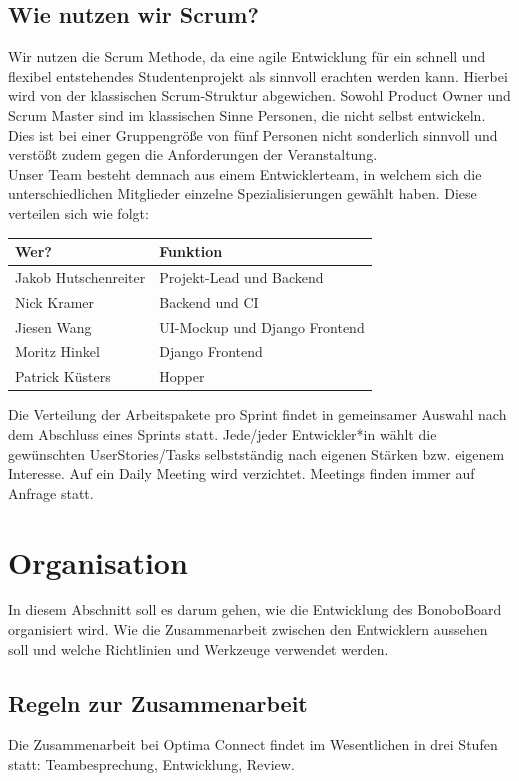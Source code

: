 \documentclass[a4paper,11pt]{scrartcl}
\begin{document}
\subsection{Wie nutzen wir Scrum?}
Wir nutzen die Scrum Methode, da eine agile Entwicklung für ein schnell und flexibel entstehendes Studentenprojekt als sinnvoll erachten werden kann. Hierbei wird von der klassischen Scrum-Struktur abgewichen. Sowohl Product Owner und Scrum Master sind im klassischen Sinne Personen, die nicht selbst entwickeln. Dies ist bei einer Gruppengröße von fünf Personen nicht sonderlich sinnvoll und verstößt zudem gegen die Anforderungen der Veranstaltung. \\
Unser Team besteht demnach aus einem Entwicklerteam, in welchem sich die unterschiedlichen Mitglieder einzelne Spezialisierungen gewählt haben. Diese verteilen sich wie folgt:
\begin{table}[H]
\begin{tabular}{|p{4.5cm}|p{8cm}|}
\hline
\textbf{Wer?} & \textbf{Funktion}\\ \hline
 Jakob Hutschenreiter &  Projekt-Lead und Backend\\ \hline
 Nick Kramer &  Backend und CI\\ \hline
 Jiesen Wang &   UI-Mockup und Django Frontend\\ \hline
 Moritz Hinkel &   Django Frontend\\ \hline
 Patrick Küsters &  Hopper\\ \hline
\end{tabular}
\end{table}

Die Verteilung der Arbeitspakete pro Sprint findet in gemeinsamer Auswahl nach dem Abschluss eines Sprints statt. Jede/jeder Entwickler*in wählt die gewünschten UserStories/Tasks selbstständig nach eigenen Stärken bzw. eigenem Interesse. Auf ein Daily Meeting wird verzichtet. Meetings finden immer auf Anfrage statt. 
\section{Organisation}\label{sec:organisation}
In diesem Abschnitt soll es darum gehen, wie die Entwicklung des BonoboBoard organisiert wird.  Wie die Zusammenarbeit zwischen den Entwicklern aussehen soll und welche Richtlinien und Werkzeuge verwendet werden.
\subsection{Regeln zur Zusammenarbeit}
Die Zusammenarbeit bei Optima Connect findet im Wesentlichen in drei Stufen statt: Teambesprechung, Entwicklung, Review.
\end{document}
